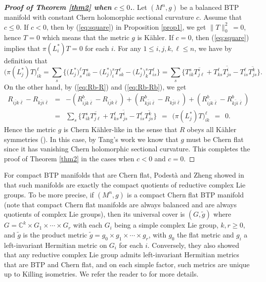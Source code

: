 \documentclass{amsart}
\begin{document}
\begin{proof}[{\bf Proof of Theorem \ref{thm2} when $c\leq 0$.}]
Let $(M^n,g)$ be a balanced BTP manifold with constant Chern holomorphic sectional curvature $c$. Assume that $c\leq 0$. If $c<0$, then by (\ref{eq:square}) in Proposition \ref{prop1}, we get $\parallel\!T\!\parallel^2_0\ =0$, hence $T=0$ which means that the metric $g$ is K\"ahler. If $c=0$, then (\ref{eq:square}) implies that $\pi(L_i^{\ast})T=0$ for each $i$. For any $1\leq i,j,k,\ell \leq n$, we have by definition that
$$ \big(\pi(L_j^{\ast})T\big)^{\ell}_{ik} = \sum_s \big\{  \big(L_j^{\ast}\big)^{\ell}_sT^s_{ik} -  \big(L_j^{\ast}\big)^{s}_i T^{\ell}_{sk}- \big(L_j^{\ast}\big)^{s}_k T^{\ell}_{is} \big\} = \sum_s \big\{ T^s_{ik} \overline{T^s_{j\ell } } + T^{\ell}_{ks} \overline{T^i_{js } } -  T^{\ell}_{is} \overline{T^k_{js } }\big\}.$$
On the other hand, by (\ref{eq:Rb-R}) and (\ref{eq:Rb-Rb}), we get
\begin{eqnarray*}
R_{i\bar{j}k\bar{\ell}} - R_{k\bar{j}i\bar{\ell}} & = & -(R^b_{i\bar{j}k\bar{\ell}} - R_{i\bar{j}k\bar{\ell}}) + (R^b_{k\bar{j}i\bar{\ell}} - R_{k\bar{j}i\bar{\ell}}) + (R^b_{i\bar{j}k\bar{\ell}} - R^b_{k\bar{j}i\bar{\ell}} ) \\
& = & \sum_s \big\{ T^s_{ik} \overline{T^s_{j\ell } } + T^{\ell}_{ks} \overline{T^i_{js } } -  T^{\ell}_{is} \overline{T^k_{js } }\big\} \ \ = \ \ \big(\pi(L_j^{\ast})T\big)^{\ell}_{ik} \ \ = \ \ 0.
\end{eqnarray*}
Hence the metric $g$ is Chern K\"ahler-like in the sense that $R$ obeys all K\"ahler symmetries (\cite{YangZ}). In this case, by Tang's work \cite{Tang} we know that $g$ must be Chern flat since it has vanishing Chern holomorphic sectional curvature. This completes the proof of Theorem \ref{thm2} in the cases when $c<0$ and $c=0$.
\end{proof}

For compact BTP manifolds that are Chern flat, Podest\`a and Zheng showed in \cite{PodestaZ} that such manifolds are exactly the compact quotients of reductive complex Lie groups. To be more precise, if $(M^n,g)$ is a compact Chern flat BTP manifold (note that compact Chern flat manifolds are always balanced and are always quotients of complex Lie groups), then its universal cover is $(G,\tilde{g})$ where $G={\mathbb C}^k \times G_1 \times \cdots \times G_r$ with each $G_i$ being a simple complex Lie group, $k,r\geq 0$, and $\tilde{g}$ is the product metric $\tilde{g}=g_0\times g_1 \times \cdots \times g_r$, with $g_0$ the flat metric and $g_i$ a left-invariant Hermitian metric on $G_i$ for each $i$. Conversely, they also showed that any reductive complex Lie group admits left-invariant Hermitian metrics that are BTP and Chern flat, and on each simple factor, such metrics are unique up to Killing isometries. We refer the reader to \cite{PodestaZ} for more details.
\end{document}
